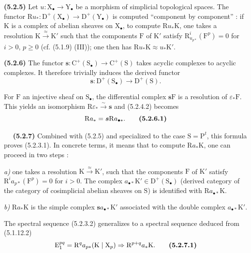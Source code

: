 \documentclass[11pt,leqno]{article}
\newcommand{\Page}[1]{\ifvmode\noindent\else\unskip\ \fi{\footnotesize\textcolor{gray}{[p.\,#1]}}\ \ignorespaces}
\begin{document}
\textbf{(5.2.5)} Let \(u:\mathrm{X}_{\bullet}\to\mathrm{Y}_{\bullet}\) be a morphism of simplicial topological spaces. The functor \(\mathrm{R}u_*:\mathrm{D}^{+}(\mathrm{X}_{\bullet})\to\mathrm{D}^{+}(\mathrm{Y}_{\bullet})\) is computed “component by component” : if \(\mathrm{K}\) is a complex of abelian sheaves on \(\mathrm{X}_{\bullet}\), to compute \(\mathrm{R}u_*\mathrm{K}\), one takes a resolution \(\mathrm{K}\xrightarrow{\approx}\mathrm{K}'\) such that the components \(\mathrm{F}\) of \(\mathrm{K}'\) satisfy \(\mathrm{R}^{i}_{u_{p*}}(\mathrm{F}^{p})=0\) for \(i>0\), \(p\geq 0\) (cf. (5.1.9) (III)); one then has \(\mathrm{R}u_*\mathrm{K}\approx u_*\mathrm{K}'\).

\textbf{(5.2.6)} The functor \(\boldsymbol{s}:\mathrm{C}^{+}(\mathrm{S}_{\bullet})\to\mathrm{C}^{+}(\mathrm{S})\) takes acyclic complexes to acyclic complexes. It therefore trivially induces the derived functor
\[
\boldsymbol{s}:\mathrm{D}^{+}(\mathrm{S}_{\bullet})\to\mathrm{D}^{+}(\mathrm{S}).
\]

For \(\mathrm{F}\) an injective sheaf on \(\mathrm{S}_{\bullet}\), the differential complex \(\boldsymbol{s}\mathrm{F}\) is a resolution of \(\varepsilon_*\mathrm{F}\). This yields an isomorphism \(\mathrm{R}\varepsilon_*\xrightarrow{\sim}\boldsymbol{s}\) and (5.2.4.2) becomes
\[
\mathrm{R}a_*=\boldsymbol{s}\mathrm{R}a_{\bullet *}.
\tag*{\textbf{(5.2.6.1)}}
\]

\Page{14}
\textbf{(5.2.7)} Combined with (5.2.5) and specialized to the case \(\mathrm{S}=\mathrm{P}^{t}\), this formula proves (5.2.3.1). In concrete terms, it means that to compute \(\mathrm{R}a_*\mathrm{K}\), one can proceed in two steps :

\textit{a)} one takes a resolution \(\mathrm{K}\xrightarrow{\approx}\mathrm{K}'\), such that the components \(\mathrm{F}\) of \(\mathrm{K}'\) satisfy \(\mathrm{R}^{i}a_{p*}(\mathrm{F}^{p})=0\) for \(i>0\). The complex \(a_{\bullet *}\mathrm{K}'\in\mathrm{D}^{+}(\mathrm{S}_{\bullet})\) (derived category of the category of cosimplicial abelian sheaves on \(\mathrm{S}\)) is identified with \(\mathrm{R}a_{\bullet *}\mathrm{K}\).

\textit{b)} \(\mathrm{R}a_*\mathrm{K}\) is the simple complex \(\boldsymbol{s}a_{\bullet *}\mathrm{K}'\) associated with the double complex \(a_{\bullet *}\mathrm{K}'\).

The spectral sequence (5.2.3.2) generalizes to a spectral sequence deduced from (5.1.12.2)
\[
\mathrm{E}_{1}^{pq}=\mathrm{R}^{q}a_{p*}(\mathrm{K}\mid\mathrm{X}_{p})
\Rightarrow \mathrm{R}^{p+q}a_*\mathrm{K}.
\tag*{\textbf{(5.2.7.1)}}
\]
\end{document}
